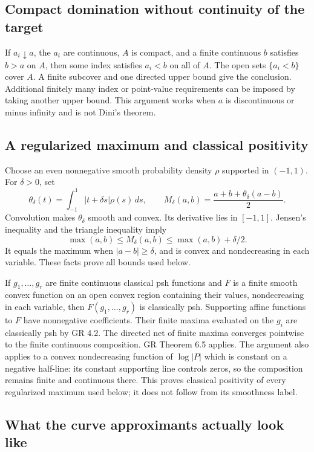 \documentclass[11pt]{article}
\begin{document}
\subsection{Compact domination without continuity of the target}

If \(a_i\downarrow a\), the \(a_i\) are continuous, \(A\) is compact, and a finite continuous \(b\) satisfies \(b>a\) on \(A\), then some index satisfies \(a_i<b\) on all of \(A\). The open sets \(\{a_i<b\}\) cover \(A\). A finite subcover and one directed upper bound give the conclusion. Additional finitely many index or point-value requirements can be imposed by taking another upper bound. This argument works when \(a\) is discontinuous or minus infinity and is not Dini's theorem.

\subsection{A regularized maximum and classical positivity}

Choose an even nonnegative smooth probability density \(\rho\) supported in \((-1,1)\). For \(\delta>0\), set
\[
\theta_\delta(t)=\int_{-1}^1 |t+\delta s|\rho(s)\,ds,
\qquad M_\delta(a,b)=\frac{a+b+\theta_\delta(a-b)}2.
\]
Convolution makes \(\theta_\delta\) smooth and convex. Its derivative lies in \([-1,1]\). Jensen's inequality and the triangle inequality imply
\[
\max(a,b)\le M_\delta(a,b)\le\max(a,b)+\delta/2.
\]
It equals the maximum when \(|a-b|\ge\delta\), and is convex and nondecreasing in each variable. These facts prove all bounds used below.

If \(g_1,\ldots,g_r\) are finite continuous classical psh functions and \(F\) is a finite smooth convex function on an open convex region containing their values, nondecreasing in each variable, then \(F(g_1,\ldots,g_r)\) is classically psh. Supporting affine functions to \(F\) have nonnegative coefficients. Their finite maxima evaluated on the \(g_i\) are classically psh by GR 4.2. The directed net of finite maxima converges pointwise to the finite continuous composition. GR Theorem 6.5 applies. The argument also applies to a convex nondecreasing function of \(\log|P|\) which is constant on a negative half-line: its constant supporting line controls zeros, so the composition remains finite and continuous there. This proves classical positivity of every regularized maximum used below; it does not follow from its smoothness label.

\subsection{What the curve approximants actually look like}
\end{document}
